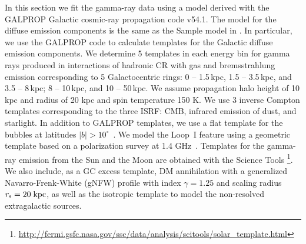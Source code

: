 In this section we fit the gamma-ray data using a model derived with the GALPROP
Galactic cosmic-ray propagation code v54.1.
The model for the diffuse emission components is the same as the Sample model in \cite{2017ApJ...840...43A}.
In particular, we use the GALPROP code to calculate templates for the Galactic diffuse emission components.
We determine 5 templates in each energy bin for gamma rays produced in 
interactions of hadronic CR with gas and bremsstrahlung emission corresponding to 5 Galactocentric rings: 
0 -- 1.5\,kpc, 1.5 -- 3.5\,kpc, and 3.5 -- 8\,kpc; 8 -- 10\,kpc, and 10 -- 50\,kpc.
We assume propagation halo height of 10 kpc and radius of 20 kpc and spin temperature 150 K.
We use 3 inverse Compton templates corresponding to the three ISRF: CMB, 
infrared emission of dust, and starlight.
In addition to GALPROP templates, we use a flat template for the \Fermi bubbles at latitudes $|b| > 10^\circ$~\citep{2014ApJ...793...64A}. 
We model the Loop~I feature using a geometric template \citep[e.g., Figure 2 of][]{2014ApJ...793...64A}
based on a polarization survey at 1.4 GHz~\citep{Wolleben:2007pq}.
Templates for the gamma-ray emission from the Sun  and the Moon
\citep{2008A&A...480..847O, 2011ApJ...734..116A, 2013arXiv1307.0197J, 2016PhRvD..93h2001A}
are obtained with the \Fermi Science Tools%
\footnote{\url{http://fermi.gsfc.nasa.gov/ssc/data/analysis/scitools/solar_template.html}}.
We also include, as a GC excess template, 
DM annihilation with a generalized Navarro-Frenk-White (gNFW) profile with index $\gamma = 1.25$ 
\citep{Goodenough:2009gk,Abazajian:2014fta, Calore:2014xka}
and scaling radius $r_{\rm s} = 20\;{\rm kpc}$, as well as the isotropic template to model the non-resolved 
extragalactic sources.



